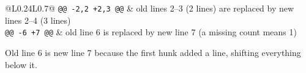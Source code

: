 \documentclass[aspectratio=169,10pt,compress]{beamer}
\begin{document}
\begin{frame}[t,fragile]
\begin{tabular}{@{}L{0.24\textwidth}L{0.7\textwidth}@{}}
  \texttt{@@ -\textcolor{oldred}{2,2} +\textcolor{newblue}{2,3} @@} &
    \textcolor{oldred}{old lines 2--3} (2 lines) are replaced by \textcolor{newblue}{new lines 2--4} (3 lines) \\
  \texttt{@@ -\textcolor{oldred}{6} +\textcolor{newblue}{7} @@} &
    \textcolor{oldred}{old line 6} is replaced by \textcolor{newblue}{new line 7} (a missing count means 1) \\
\end{tabular}

Old line 6 is new line 7 because the first hunk added a line, shifting everything below it.
\end{frame}

\end{document}
